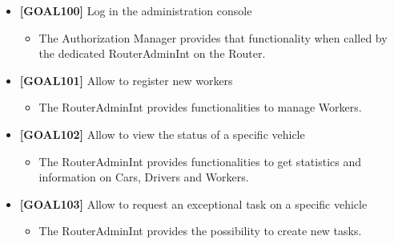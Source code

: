\begin{itemize}
\begin{itemize}
	\end{itemize}
\item \textbf{[GOAL100]} Log in the administration console
	\begin{itemize}
	\item The Authorization Manager provides that functionality when called by the dedicated RouterAdminInt on the Router.
	\end{itemize}
\item \textbf{[GOAL101]} Allow to register new workers
	\begin{itemize}
	\item The RouterAdminInt provides functionalities to manage Workers.
	\end{itemize}
\item \textbf{[GOAL102]} Allow to view the status of a specific vehicle
	\begin{itemize}
	\item The RouterAdminInt provides functionalities to get statistics and information on Cars, Drivers and Workers.
	\end{itemize}
\item \textbf{[GOAL103]} Allow to request an exceptional task on a specific vehicle
	\begin{itemize}
	\item The RouterAdminInt provides the possibility to create new tasks.
	\end{itemize}
\end{itemize}